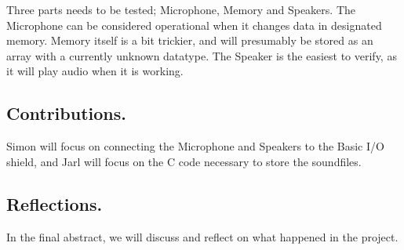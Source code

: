 \documentclass[a4paper,11pt,twoside]{article}
\begin{document}
Three parts needs to be tested; Microphone, Memory and Speakers.
The Microphone can be considered operational when it changes data in designated memory.
Memory itself is a bit trickier, and will presumably be stored as an array with a currently unknown datatype.
The Speaker is the easiest to verify, as it will play audio when it is working.

\subsection*{Contributions.}

Simon will focus on connecting the Microphone and Speakers to the Basic I/O shield, and Jarl will focus on the C code necessary to store the soundfiles.

\subsection*{Reflections.}

In the final abstract, we will discuss and reflect on what happened in the project.
\end{document}
